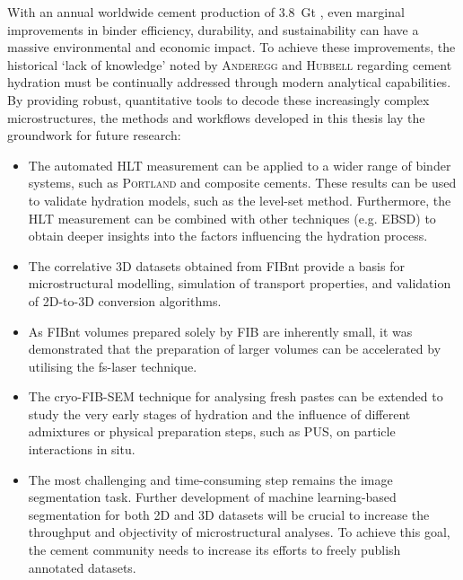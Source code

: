 With an annual worldwide cement production of \qty{3.8}{\giga\tonne} \cite{usgs.2026}, even mar\-gi\-nal improvements in binder efficiency, durability, and sustainability can have a massive environmental and economic impact.
To achieve these improvements, the historical `lack of knowledge' noted by \textsc{Anderegg} and \textsc{Hubbell} \cite{anderegg.1929} regarding cement hydration must be continually addressed through modern analytical capabilities.
By providing robust, quantitative tools to decode these increasingly complex microstructures, the methods and workflows developed in this thesis lay the groundwork for future research:
\begin{itemize}
    \item The automated \ac{HLT} measurement can be applied to a wider range of binder systems, such as \textsc{Portland} and composite cements. These results can be used to validate hydration models, such as the level-set method. Furthermore, the \ac{HLT} measurement can be combined with other techniques (e.g. \ac{EBSD}) to obtain deeper insights into the factors influencing the hydration process.
    \item The correlative 3D datasets obtained from \ac{FIBnt} provide a basis for microstructural modelling, simulation of transport properties, and validation of 2D-to-3D conversion algorithms.
    \item As \ac{FIBnt} volumes prepared solely by \ac{FIB} are inherently small, it was demonstrated that the preparation of larger volumes can be accelerated by utilising the \acl{fs-laser} technique.
    \item The cryo-\ac{FIB}-\ac{SEM} technique for analysing fresh pastes can be extended to study the very early stages of hydration and the influence of different admixtures or physical preparation steps, such as \ac{PUS}, on particle interactions in situ.
    \item The most challenging and time-consuming step remains the image segmentation task.
    Further development of machine learning-based segmentation for both 2D and 3D datasets will be crucial to increase the throughput and objectivity of microstructural analyses.
    To achieve this goal, the cement community needs to increase its efforts to freely publish annotated datasets.
\end{itemize}